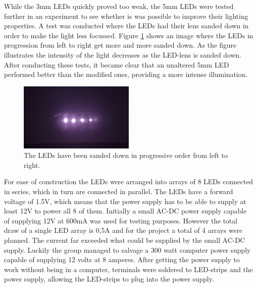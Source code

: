 While the 3mm LEDs quickly proved too weak, the 5mm LEDs were tested further in an experiment to see whether is was possible to improve their lighting properties. A test was conducted where the LEDs had their lens sanded down in order to make the light less focussed. Figure \ref{fig:leds_sanded} shows an image where the LEDs in progression from left to right get more and more sanded down. As the figure illustrates the intensity of the light decreases as the LED-lens is sanded down. After conducting these tests, it became clear that an unaltered 5mm LED performed better than the modified ones, providing a more intense illumination.

\begin{figure} [htbp]
\centering
\includegraphics[width=0.50\textwidth]{Pictures/Theory/sanded_leds.jpg}
\caption{The LEDs have been sanded down in progressive order from left to right.}
\label{fig:leds_sanded}
\end{figure}

For ease of construction the LEDs were arranged into arrays of 8 LEDs connected in series, which in turn are connected in parallel. The LEDs have a forward voltage of 1.5V, which means that the power supply has to be able to supply at least 12V to power all 8 of them. Initially a small AC-DC power supply capable of supplying 12V at 600mA was used for testing purposes. However the total draw of a single LED array is 0,5A and for the project a total of 4 arrays were planned. The current far exceeded what could be supplied by the small AC-DC supply. Luckily the group managed to salvage a 300 watt computer power supply capable of supplying 12 volts at 8 amperes. After getting the power supply to work without being in a computer, terminals were soldered to LED-strips and the power supply, allowing the LED-strips to plug into the power supply.

